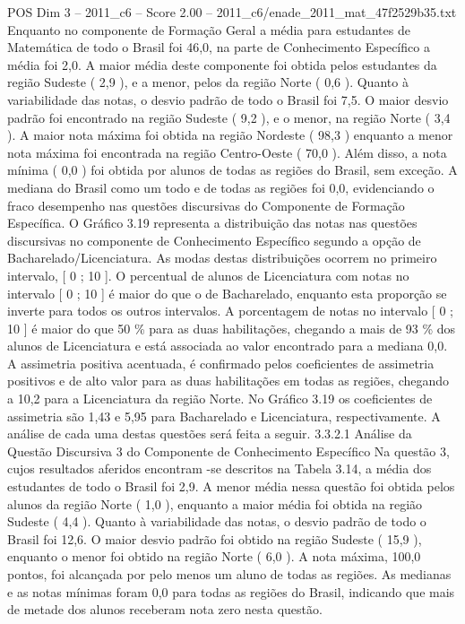 \begin{textsample}{POS Dim 3 – 2011\_c6 – Score 2.00 – 2011\_c6/enade\_2011\_mat\_47f2529b35.txt}
Enquanto no componente de Formação Geral a média para estudantes de Matemática de todo o Brasil foi 46,0, na parte de Conhecimento Específico a média foi 2,0.
A maior média deste componente foi obtida pelos estudantes da região Sudeste ( 2,9 ), e a menor, pelos da região Norte ( 0,6 ).
Quanto à variabilidade das notas, o desvio padrão de todo o Brasil foi 7,5.
O maior desvio padrão foi encontrado na região Sudeste ( 9,2 ), e o menor, na região Norte ( 3,4 ).
A maior nota máxima foi obtida na região Nordeste ( 98,3 ) enquanto a menor nota máxima foi encontrada na região Centro-Oeste ( 70,0 ).
Além disso, a nota mínima ( 0,0 ) foi obtida por alunos de todas as regiões do Brasil, sem exceção.
A mediana do Brasil como um todo e de todas as regiões foi 0,0, evidenciando o fraco desempenho nas questões discursivas do Componente de Formação Específica.
O Gráfico 3.19 representa a distribuição das notas nas questões discursivas no componente de Conhecimento Específico segundo a opção de Bacharelado/Licenciatura.
As modas destas distribuições ocorrem no primeiro intervalo, [ 0 ; 10 ].
O percentual de alunos de Licenciatura com notas no intervalo [ 0 ; 10 ] é maior do que o de Bacharelado, enquanto esta proporção se inverte para todos os outros intervalos.
A porcentagem de notas no intervalo [ 0 ; 10 ] é maior do que 50 \% para as duas habilitações, chegando a mais de 93 \% dos alunos de Licenciatura e está associada ao valor encontrado para a mediana 0,0.
A assimetria positiva acentuada, é confirmado pelos coeficientes de assimetria positivos e de alto valor para as duas habilitações em todas as regiões, chegando a 10,2 para a Licenciatura da região Norte.
No Gráfico 3.19 os coeficientes de assimetria são 1,43 e 5,95 para Bacharelado e Licenciatura, respectivamente.
A análise de cada uma destas questões será feita a seguir. 3.3.2.1 Análise da Questão Discursiva 3 do Componente de Conhecimento Específico Na questão 3, cujos resultados aferidos encontram -se descritos na Tabela 3.14, a média dos estudantes de todo o Brasil foi 2,9.
A menor média nessa questão foi obtida pelos alunos da região Norte ( 1,0 ), enquanto a maior média foi obtida na região Sudeste ( 4,4 ).
Quanto à variabilidade das notas, o desvio padrão de todo o Brasil foi 12,6.
O maior desvio padrão foi obtido na região Sudeste ( 15,9 ), enquanto o menor foi obtido na região Norte ( 6,0 ).
A nota máxima, 100,0 pontos, foi alcançada por pelo menos um aluno de todas as regiões.
As medianas e as notas mínimas foram 0,0 para todas as regiões do Brasil, indicando que mais de metade dos alunos receberam nota zero nesta questão.

\end{textsample}
